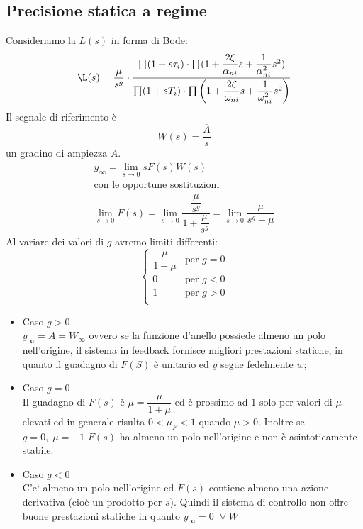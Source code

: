 \documentclass[a4paper]{report}
\begin{document}
\subsection{Precisione statica a regime}
Consideriamo la $L(s)$ in forma di Bode:
\[
\L(s) = \dfrac{\mu}{s^g} \cdot \dfrac{\prod (1 + s\tau_i) \cdot \prod
  (1 + \dfrac{2 \xi}{\alpha_{ni}}s + \dfrac{1}{\alpha_{ni}^2}
  s^2)}{\prod (1 + sT_i) \cdot \prod \left(1 + \dfrac{2
    \zeta}{\omega_{ni}}s + \dfrac{1}{\omega_{ni}^2}s^2\right)}
\]
Il segnale di riferimento \`e
\[
W(s) = \dfrac{\overline{A}}{s}
\]
un gradino di ampiezza $A$.
\[
\begin{array}{l}
  y_{\infty} = \lim_{s \to 0} sF(s) W(s)\\
  \textrm{con le opportune sostituzioni}\\
  \lim_{s \to 0} F(s) = \lim_{s \to 0}\dfrac{\dfrac{\mu}{s^g}}{1 +
    \dfrac{\mu}{s^g}} = \lim_{s \to 0} \dfrac{\mu}{s^g + \mu}
\end{array}
\]
Al variare dei valori di $g$ avremo limiti differenti:
\[
\left\{
\begin{array}{ll}
  \dfrac{\mu}{1 + \mu} & \textrm{per } g = 0\\
  0 & \textrm{per } g < 0\\
  1 & \textrm{per } g > 0\\
\end{array}
\right.
\]
\begin{itemize}
\item Caso $g > 0$\\
  $y_{\infty} = A = W_{\infty}$ ovvero se la funzione d'anello
  possiede almeno un polo nell'origine, il sistema in feedback
  fornisce migliori prestazioni statiche, in quanto il guadagno di
  $F(S)$ \`e unitario ed $y$ segue fedelmente $w$;
\item Caso $g = 0$\\
  Il guadagno di $F(s)$ \`e $\mu = \dfrac{\mu}{1 + \mu}$ ed \`e
  prossimo ad $1$ solo per valori di $\mu$ elevati ed in generale
  risulta $0 < \mu_F < 1$ quando $\mu > 0$. Inoltre se $g = 0, \; \mu
  = -1$ $F(s)$ ha almeno un polo nell'origine e non \`e
  asintoticamente stabile.
\item Caso $g < 0$\\
  C'e` almeno un polo nell'origine ed $F(s)$ contiene almeno una
  azione derivativa (cio\`e un prodotto per $s$). Quindi il sistema di
  controllo non offre buone prestazioni statiche in quanto $y_{\infty}
  = 0 \;\; \forall \;W$ 
\end{itemize}
\end{document}
